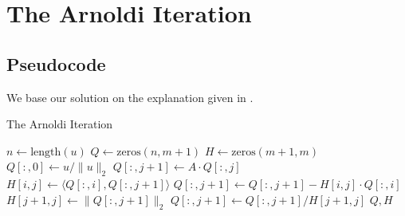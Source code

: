 \section{The Arnoldi Iteration}

\subsection{Pseudocode}

We base our solution on the explanation given in \citet{arnoldi2025lab}.

\begin{algorithm}[H]
    \begin{algorithmic}
        \caption{The Arnoldi Iteration}
        \State$n\gets\text{length}(u)$
        \State$Q\gets\text{zeros}(n,m+1)$
        \State$H\gets\text{zeros}(m+1,m)$
        \State$Q[:,0]\gets u/\|u\|_2$
        \State$Q[:,j+1]\gets A\cdot Q[:,j]$
        \State$H[i,j]\gets\langle Q[:,i],Q[:,j+1]\rangle$
        \State$Q[:,j+1]\gets Q[:,j+1]-H[i,j]\cdot Q[:,i]$
        \EndFor
        \State$H[j+1,j]\gets\|Q[:,j+1]\|_2$
        \State$Q[:,j+1]\gets Q[:,j+1]/H[j+1,j]$
        \EndFor
        \State\Return$Q,H$
        \EndProcedure
    \end{algorithmic}
\end{algorithm}
